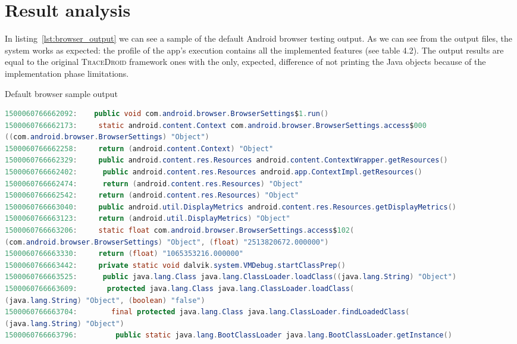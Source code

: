 \section{Result analysis}
\label{sec:result_analysis}

In listing~\ref{lst:browser_output} we can see a sample of the default Android browser
testing output. As we can see from the output files, the system works
as expected: the profile of the app's execution contains all the
implemented features (see table 4.2). The output results are equal to the
original \textsc{TraceDroid} framework ones with the only, expected, difference of
not printing the Java objects because of the implementation phase limitations.

\begin{listing}[!h]
  \begin{adjustwidth}{-9em}{-9em}
    \caption{Default browser sample output}
    \label{lst:browser_output}
    \begin{lstlisting}[language=Java]
1500060766662092:    public void com.android.browser.BrowserSettings$1.run()
1500060766662173:     static android.content.Context com.android.browser.BrowserSettings.access$000
((com.android.browser.BrowserSettings) "Object")
1500060766662258:     return (android.content.Context) "Object"
1500060766662329:     public android.content.res.Resources android.content.ContextWrapper.getResources()
1500060766662402:      public android.content.res.Resources android.app.ContextImpl.getResources()
1500060766662474:      return (android.content.res.Resources) "Object"
1500060766662542:     return (android.content.res.Resources) "Object"
1500060766663040:     public android.util.DisplayMetrics android.content.res.Resources.getDisplayMetrics()
1500060766663123:     return (android.util.DisplayMetrics) "Object"
1500060766663206:     static float com.android.browser.BrowserSettings.access$102(
(com.android.browser.BrowserSettings) "Object", (float) "2513820672.000000")
1500060766663330:     return (float) "1065353216.000000"
1500060766663442:     private static void dalvik.system.VMDebug.startClassPrep()
1500060766663525:      public java.lang.Class java.lang.ClassLoader.loadClass((java.lang.String) "Object")
1500060766663609:       protected java.lang.Class java.lang.ClassLoader.loadClass(
(java.lang.String) "Object", (boolean) "false")
1500060766663704:        final protected java.lang.Class java.lang.ClassLoader.findLoadedClass(
(java.lang.String) "Object")
1500060766663796:         public static java.lang.BootClassLoader java.lang.BootClassLoader.getInstance()

\end{lstlisting}
\end{adjustwidth}
\end{listing}
